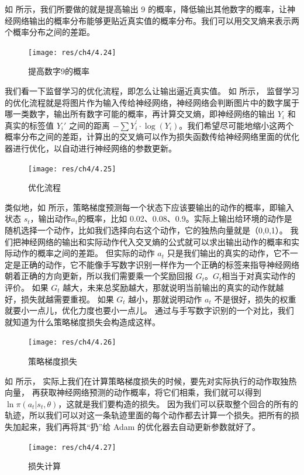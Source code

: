 如 所示，我们所要做的就是提高输出 9 的概率，降低输出其他数字的概率，让神经网络输出的概率分布能够更贴近真实值的概率分布。我们可以用交叉熵来表示两个概率分布之间的差距。

\begin{figure}[hbt]
    \centering
    \texttt{[image: res/ch4/4.24]}
    \caption{提高数字9的概率}
    \label{fig:fig4.24}
\end{figure}

我们看一下监督学习的优化流程，即怎么让输出逼近真实值。
如 所示，
监督学习的优化流程就是将图片作为输入传给神经网络，神经网络会判断图片中的数字属于哪一类数字，输出所有数字可能的概率，再计算交叉熵，即神经网络的输出 $Y_i$ 和真实的标签值 $Y_i'$ 之间的距离 $-\sum Y_{i}^{\prime} \cdot \log \left(Y_{i}\right)$。我们希望尽可能地缩小这两个概率分布之间的差距，计算出的交叉熵可以作为损失函数传给神经网络里面的优化器进行优化，以自动进行神经网络的参数更新。
\begin{figure}[hbt]
    \centering
    \texttt{[image: res/ch4/4.25]}
    \caption{优化流程}
    \label{fig:fig4.25}
\end{figure}

类似地，如 所示，策略梯度预测每一个状态下应该要输出的动作的概率，即输入状态 $s_t$，输出动作$a_t$的概率，比如 0.02、0.08、0.9。实际上输出给环境的动作是随机选择一个动作，比如我们选择向右这个动作，它的独热向量就是（0,0,1）。
我们把神经网络的输出和实际动作代入交叉熵的公式就可以求出输出动作的概率和实际动作的概率之间的差距。
但实际的动作 $a_t$ 只是我们输出的真实的动作，它不一定是正确的动作，它不能像手写数字识别一样作为一个正确的标签来指导神经网络朝着正确的方向更新，所以我们需要乘一个奖励回报 $G_t$。$G_t$相当于对真实动作的评价。
如果 $G_t$ 越大，未来总奖励越大，那就说明当前输出的真实的动作就越好，损失就越需要重视。
如果 $G_t$ 越小，那就说明动作 $a_t$ 不是很好，损失的权重就要小一点儿，优化力度也要小一点儿。
通过与手写数字识别的一个对比，我们就知道为什么策略梯度损失会构造成这样。
\begin{figure}[hbt]
    \centering
    \texttt{[image: res/ch4/4.26]}
    \caption{策略梯度损失}
    \label{fig:fig4.26}
\end{figure}

如 所示，
实际上我们在计算策略梯度损失的时候，要先对实际执行的动作取独热向量，
再获取神经网络预测的动作概率，将它们相乘，我们就可以得到 $\ln \pi(a_t|s_t,\theta)$，这就是我们要构造的损失。
因为我们可以获取整个回合的所有的轨迹，所以我们可以对这一条轨迹里面的每个动作都去计算一个损失。把所有的损失加起来，我们再将其“扔”给 Adam 的优化器去自动更新参数就好了。
\begin{figure}[hbt]
    \centering
    \texttt{[image: res/ch4/4.27]}
    \caption{损失计算}
    \label{fig:fig4.27}
\end{figure}

